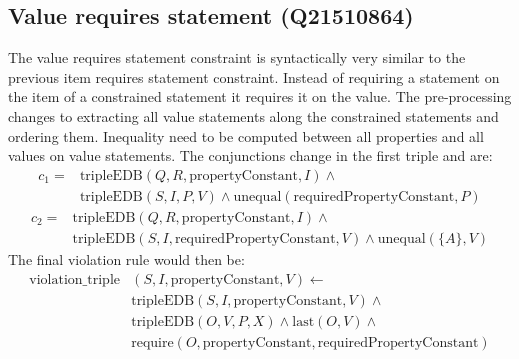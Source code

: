 \documentclass[hyperref,bachelorofscience,fleqn]{cgvpub}
\begin{document}
\subsection{Value requires statement (Q21510864)}
The value requires statement constraint is syntactically very similar to the previous item requires statement constraint. Instead of requiring a statement on the item of a constrained statement it requires it on the value. The pre-processing changes to extracting all value statements along the constrained statements and ordering them. Inequality need to be computed between all properties and all values on value statements. The conjunctions change in the first triple and are:
\begin{equation*}
\begin{split}
c_1 = &\text{tripleEDB}(Q, R, \text{propertyConstant}, I) \wedge \\
&\text{tripleEDB}(S, I, P, V) \wedge \text{unequal}(\text{requiredPropertyConstant}, P)
\end{split}
\end{equation*} \(\)
\begin{equation*}
\begin{split}
c_2 = &\text{tripleEDB}(Q, R, \text{propertyConstant}, I) \wedge \\
&\text{tripleEDB}(S, I, \text{requiredPropertyConstant}, V) \wedge \text{unequal}(\{A\}, V)
\end{split}
\end{equation*}
The final violation rule would then be:
\begin{equation*}
\begin{split}
\text{violation\_triple}&(S, I, \text{propertyConstant}, V) \leftarrow \\
&\text{tripleEDB}(S, I, \text{propertyConstant}, V) \wedge \\
&\text{tripleEDB}(O, V, P, X) \wedge \text{last}(O, V) \wedge \\
&\text{require}(O, \text{propertyConstant}, \text{requiredPropertyConstant})
\end{split}
\end{equation*}
\end{document}
